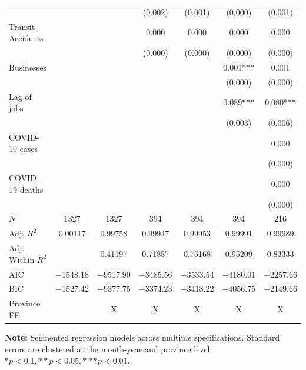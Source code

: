 \documentclass[11pt,a4paper]{article}\usepackage[]{graphicx}\usepackage[]{xcolor}
\begin{document}
\begin{table}[htbp!]
\begin{tabular}[t]{lcccccc}
 &  &  & (\num{0.002}) & (\num{0.001}) & (\num{0.000}) & (\num{0.001})\\
Transit Accidents &  &  & \num{0.000} & \num{0.000} & \num{0.000} & \num{0.000}\\
 &  &  & (\num{0.000}) & (\num{0.000}) & (\num{0.000}) & (\num{0.000})\\
Businesses &  &  &  &  & \num{0.001}*** & \num{0.001}\\
 &  &  &  &  & (\num{0.000}) & (\num{0.000})\\
Lag of jobs &  &  &  &  & \num{0.089}*** & \num{0.080}***\\
 &  &  &  &  & (\num{0.003}) & (\num{0.006})\\
COVID-19 cases &  &  &  &  &  & \num{0.000}\\
 &  &  &  &  &  & \vphantom{1} (\num{0.000})\\
COVID-19 deaths &  &  &  &  &  & \num{0.000}\\
 &  &  &  &  &  & (\num{0.000})\\
\midrule
$N$ & \num{1327} & \num{1327} & \num{394} & \num{394} & \num{394} & \num{216}\\
Adj. $R^2$ & \num{0.00117} & \num{0.99758} & \num{0.99947} & \num{0.99953} & \num{0.99991} & \num{0.99989}\\
Adj. Within $R^2$ &  & \num{0.41197} & \num{0.71887} & \num{0.75168} & \num{0.95209} & \num{0.83333}\\
AIC & \num{-1548.18} & \num{-9517.90} & \num{-3485.56} & \num{-3533.54} & \num{-4180.01} & \num{-2257.66}\\
BIC & \num{-1527.42} & \num{-9377.75} & \num{-3374.23} & \num{-3418.22} & \num{-4056.75} & \num{-2149.66}\\
Province FE &  & X & X & X & X & X\\
\bottomrule
\end{tabular}


\vspace{0.3cm}
\textbf{Note:} Segmented regression models across multiple specifications. Standard errors are clustered at the month-year and province level.\\
$ *p < 0.1, **p < 0.05, ***p < 0.01.$
\end{table}
\end{document}
